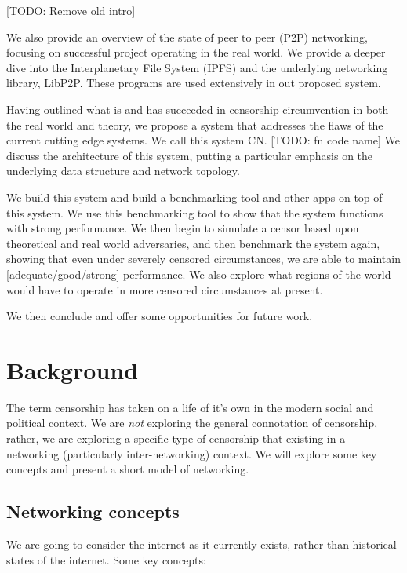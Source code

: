 \documentclass[12pt]{report}
\begin{document}
[TODO: Remove old intro]

We also provide an overview of the state of peer to peer (P2P) networking, focusing on successful project operating in the real world. We provide a deeper dive into the Interplanetary File System (IPFS) and the underlying networking library, LibP2P. These programs are used extensively in out proposed system.

Having outlined what is and has succeeded in censorship circumvention in both the real world and theory, we propose a system that addresses the flaws of the current cutting edge systems. We call this system CN. [TODO: fn code name] We discuss the architecture of this system, putting a particular emphasis on the underlying data structure and network topology.

We build this system and build a benchmarking tool and other apps on top of this system. We use this benchmarking tool to show that the system functions with strong performance. We then begin to simulate a censor based upon theoretical and real world adversaries, and then benchmark the system again, showing that even under severely censored circumstances, we are able to maintain [adequate/good/strong] performance. We also explore what regions of the world would have to operate in more censored circumstances at present.

We then conclude and offer some opportunities for future work.

\chapter{Background}

The term censorship has taken on a life of it's own in the modern social and political context. We are \emph{not} exploring the general connotation of censorship, rather, we are exploring a specific type of censorship that existing in a networking (particularly inter-networking) context. We will explore some key concepts and present a short model of networking.

\section{Networking concepts}
\label{networking}

We are going to consider the internet as it currently exists, rather than historical states of the internet. Some key concepts:
\end{document}

